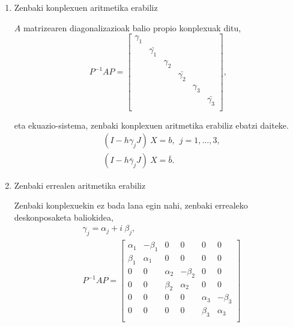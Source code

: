 \begin{enumerate}
\item Zenbaki konplexuen aritmetika erabiliz

$A$ matrizearen diagonalizazioak balio propio konplexuak ditu, 
\begin{equation*}
P^{-1}AP=\begin{bmatrix}
  \gamma_1 &                &          &                &           &                 \\
           & \bar{\gamma_1} &          &                &           &                 \\
           &                & \gamma_2 &                &           &                 \\
           &                &          & \bar{\gamma_2} &           &                 \\ 
           &                &          &                & \gamma_3   &                 \\
           &                &          &                &            & \bar{\gamma_3} \\  
\end{bmatrix},
\end{equation*}

eta ekuazio-sistema, zenbaki konplexuen aritmetika erabiliz ebatzi daiteke.
\begin{align*}
&(I-h \gamma_j J) \ X = b, \ \ j=1,\dots,3, \\
&(I-h \bar{\gamma}_j J) \ X = \bar{b}. 
\end{align*}

\item Zenbaki errealen aritmetika erabiliz

Zenbaki konplexuekin ez bada lana egin nahi, zenbaki errealeko deskonposaketa baliokidea,
\begin{align*}
&\gamma_j=\alpha_j + i \ \beta_j,\\
&P^{-1}AP=\begin{bmatrix}
\alpha_{1} & -\beta_{1}   &  0            &  0            &  0           &    0       \\
\beta_{1}  & \alpha_{1}   & 0             &  0            &  0           &    0       \\
 0          & 0             & \alpha_{2}  & -\beta_{2}    &  0           &    0       \\
 0          & 0             & \beta_{2}   & \alpha_{2}    &  0           &    0       \\
 0          & 0             &  0          & 0             & \alpha_{3}  & -\beta_{3}  \\
 0          & 0             &  0          & 0             & \beta_{3}   & \alpha_{3}  \\
\end{bmatrix}
\end{align*}

\end{enumerate}

